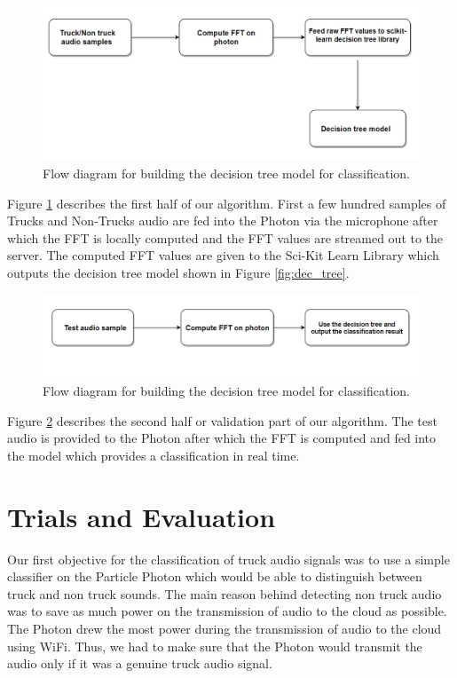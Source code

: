 \documentclass[sigconf, authorversion=false,  screen=true]{acmart}
\begin{document}
	\begin{figure}
		\includegraphics[width=\linewidth]{1}
		\caption{Flow diagram for building the decision tree model for classification.}
		\label{fig:1}
	\end{figure}

	Figure \ref{fig:1} describes the first half of our algorithm. First a few hundred samples of Trucks and Non-Trucks audio are fed into the Photon via the microphone after which the FFT is locally computed and the FFT values are streamed out to the server. The computed FFT values are given to the Sci-Kit Learn Library which outputs the decision tree model shown in Figure \ref{fig:dec_tree}.
	
	\begin{figure}
		\includegraphics[width=\linewidth]{2}
		\caption{Flow diagram for building the decision tree model for classification.}
		\label{fig:2}
	\end{figure}

	Figure \ref{fig:2} describes the second half or validation part of our algorithm. The test audio is provided to the Photon after which the FFT is computed and fed into the model which provides a classification in real time.
    
\section{Trials and Evaluation}
	Our first objective for the classification of truck audio signals was to use a simple classifier on the Particle Photon which would be able to distinguish between truck and non truck sounds. The main reason behind detecting non truck audio was to save as much power on the transmission of audio to the cloud as possible. The Photon drew the most power during the transmission of audio to the cloud using WiFi. Thus, we had to make sure that the Photon would transmit the audio only if it was a genuine truck audio signal.
\end{document}

